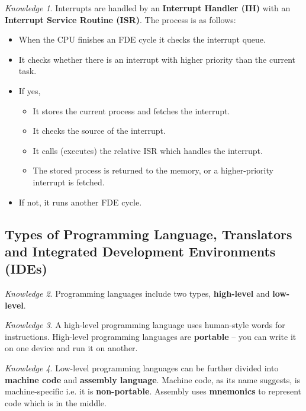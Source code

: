 \documentclass[8pt]{article}
\theoremstyle{remark}
\newtheorem{knowledge}{Knowledge}[subsection]
\begin{document}
            \begin{knowledge}
                Interrupts are handled by an \textbf{Interrupt Handler (IH)} with an \textbf{Interrupt Service Routine (ISR)}. The process is as follows:
                \begin{itemize}
                    \item When the CPU finishes an FDE cycle it checks the interrupt queue.
                    \item It checks whether there is an interrupt with higher priority than the current task.
                    \item If yes,
                    \begin{itemize}
                        \item It stores the current process and fetches the interrupt.
                        \item It checks the source of the interrupt.
                        \item It calls (executes) the relative ISR which handles the interrupt.
                        \item The stored process is returned to the memory, or a higher-priority interrupt is fetched.
                    \end{itemize}
                    \item If not, it runs another FDE cycle.
                \end{itemize}
            \end{knowledge}

        \subsection{Types of Programming Language, Translators and Integrated Development Environments (IDEs)}
            \begin{knowledge}
                Programming languages include two types, \textbf{high-level} and \textbf{low-level}.
            \end{knowledge}
            
            \begin{knowledge}
                A high-level programming language uses human-style words for instructions. High-level programming languages are \textbf{portable} -- you can write it on one device and run it on another.
            \end{knowledge}

            \begin{knowledge}
                Low-level programming languages can be further divided into \textbf{machine code} and \textbf{assembly language}. Machine code, as its name suggests, is machine-specific i.e. it is \textbf{non-portable}. Assembly uses \textbf{mnemonics} to represent code which is in the middle.
            \end{knowledge}
\end{document}
